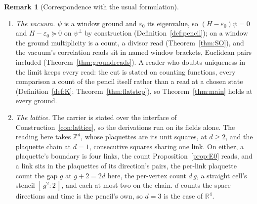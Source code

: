 \documentclass[11pt]{article}
\theoremstyle{definition}
\newtheorem{remark}{Remark}
\begin{document}
\begin{remark}[Correspondence with the usual formulation]
\begin{enumerate}[leftmargin=2em,itemsep=3pt]
(Brauer, Klimyk), and Lemma~\ref{lem:mixedinv} the Schur--Weyl
invariant span. That reading
extends to the local objects: the characters are the blocks' traces on
holonomies, the product reading
$\mathrm{tr}(A\otimes B)=\mathrm{tr}\,A\cdot\mathrm{tr}\,B$ with
$d_a=\chi_a(1)$; the adjoint character runs pointwise over $[-1,n^2-1]$
and the fundamental trace's modulus over $[0,n]$, the tops at $U=1$, the
form caps of Lemmas~\ref{lem:fpcap} and~\ref{lem:loopcap} read
pointwise; the form line of Proposition~\ref{prop:form} is the invariant
symmetric bilinear forms on $\mathfrak{su}(n)$; the two-plaquette fiber
of Construction~\ref{con:fiber} is $L^2(G\times G)^G$, the functions of
the two plaquette holonomies invariant under simultaneous conjugation,
the theta graph's gauge reduction; and $\mathfrak A$
(Definition~\ref{def:qla}) is the quasi-local $C^*$-algebra, the norm
closure of the inductive limit of the local algebras.

\item \emph{The vacuum.} $\psi$ is a window ground and $\varepsilon_0$ its
eigenvalue, so $(H-\varepsilon_0)\psi=0$ and $H-\varepsilon_0\succeq0$ on
$\psi^\perp$ by construction (Definition~\ref{def:pencil}); on a window the
ground multiplicity is a count, a divisor read
(Theorem~\ref{thm:SO}), and the vacuum's correlation reads sit in
named window brackets, Euclidean pairs included
(Theorem~\ref{thm:groundreads}). A reader who doubts uniqueness in the limit
keeps every read: the cut is stated on counting functions, every
comparison a count of the pencil itself rather than a read at a chosen
state (Definition~\ref{def:K}; Theorem~\ref{thm:flatstep}), so
Theorem~\ref{thm:main} holds at every ground.

\item \emph{The lattice.} The carrier is stated over the interface of
Construction~\ref{con:lattice}, so the
derivations run on its fields alone. The reading here takes $\mathbb Z^d$, whose
plaquettes are its unit squares, at $d\ge2$, and the plaquette chain at $d=1$,
consecutive squares sharing one link. On either, a plaquette's boundary
is four links, the count Proposition~\ref{prop:E0} reads, and a
link sits in the plaquettes of its direction's pairs, the per-link
plaquette count the gap $g$ at $g+2=2d$ here, the per-vertex
count $d\,g$, a straight cell's stencil $[\,g^{2}:2\,]$, and each
at most two on the chain. $d$ counts the
space directions and time is the pencil's own, so $d=3$ is the case of
$\mathbb R^4$.


\end{enumerate}
\end{remark}
\end{document}
